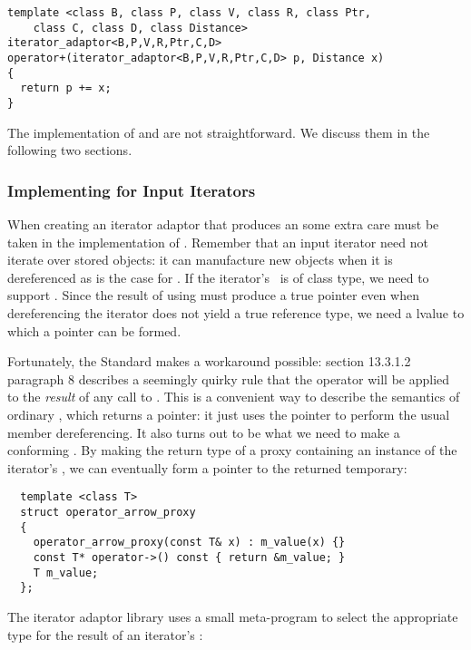 \documentclass{netobjectdays}
\newcommand{\valuetype}{\code{value\_\-type}}
\begin{document}
{\footnotesize
\begin{verbatim}
template <class B, class P, class V, class R, class Ptr,
    class C, class D, class Distance>
iterator_adaptor<B,P,V,R,Ptr,C,D>
operator+(iterator_adaptor<B,P,V,R,Ptr,C,D> p, Distance x)
{
  return p += x;
}
\end{verbatim}
}

The implementation of  and are not
straightforward. We discuss them in the following two sections.

\subsubsection{Implementing  for Input Iterators}
\label{sec:operator-arrow}

When creating an iterator adaptor that produces an
 some extra care must be taken in the
implementation of . Remember that an input iterator
need not iterate over stored objects: it can manufacture new objects
when it is dereferenced as is the case for
. If the iterator's \valuetype\ is of
class type, we need to support . Since the result of
using  must produce a true pointer even when
dereferencing the iterator does not yield a true reference type, we
need a  lvalue to which a pointer can be formed.

Fortunately, the Standard makes a workaround possible: section
13.3.1.2 paragraph 8 describes a seemingly quirky rule that the
\code{->} operator will be applied to the \emph{result} of any call to
. This is a convenient way to describe the semantics
of ordinary , which returns a pointer: it just uses
the pointer to perform the usual member dereferencing. It also turns
out to be what we need to make a conforming
. By making the return type of
 a proxy containing an instance of the iterator's
\valuetype{}, we can eventually form a  pointer to the
returned temporary:

{\footnotesize
\begin{verbatim}
  template <class T>
  struct operator_arrow_proxy
  {
    operator_arrow_proxy(const T& x) : m_value(x) {}
    const T* operator->() const { return &m_value; }
    T m_value;
  };
\end{verbatim}
}

\noindent The iterator adaptor library uses a small meta-program to
select the appropriate type for the result of an iterator's
:
\end{document}
